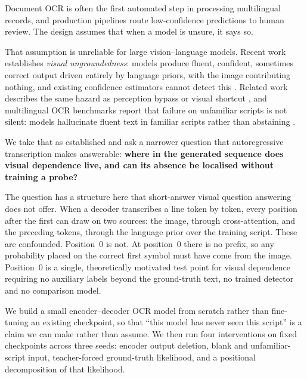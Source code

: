 \documentclass{article}
\begin{document}
Document OCR is often the first automated step in processing multilingual records, and
production pipelines route low-confidence predictions to human review. The design assumes that
when a model is unsure, it says so.

That assumption is unreliable for large vision--language models. Recent work establishes
\emph{visual ungroundedness}: models produce fluent, confident, sometimes correct output
driven entirely by language priors, with the image contributing nothing, and existing
confidence estimators cannot detect this \citep{khanmohammadi2026bicr}. Related work describes
the same hazard as perception bypass or visual shortcut \citep{videoworldmodels2026}, and
multilingual OCR benchmarks report that failure on unfamiliar scripts is not silent: models
hallucinate fluent text in familiar scripts rather than abstaining
\citep{kargaran2026glotocr}.

We take that as established and ask a narrower question that autoregressive transcription
makes answerable: \textbf{where in the generated sequence does visual dependence live, and can
its absence be localised without training a probe?}

The question has a structure here that short-answer visual question answering does not offer.
When a decoder transcribes a line token by token, every position after the first can draw on
two sources: the image, through cross-attention, and the preceding tokens, through the
language prior over the training script. These are confounded. Position~0 is not. At
position~0 there is no prefix, so any probability placed on the correct first symbol must have
come from the image. Position~0 is a single, theoretically motivated test point for visual
dependence requiring no auxiliary labels beyond the ground-truth text, no trained detector and
no comparison model.

We build a small encoder--decoder OCR model from scratch rather than fine-tuning an existing
checkpoint, so that ``this model has never seen this script'' is a claim we can make rather
than assume. We then run four interventions on fixed checkpoints across three seeds: encoder
output deletion, blank and unfamiliar-script input, teacher-forced ground-truth likelihood,
and a positional decomposition of that likelihood.
\end{document}
